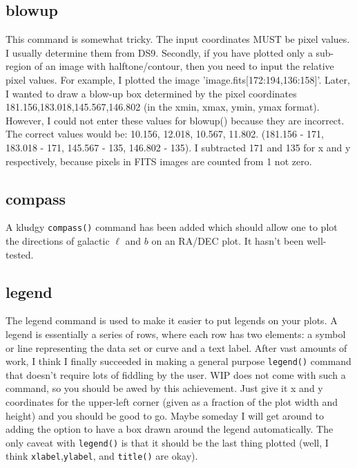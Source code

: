 \documentclass[12pt]{article}
\begin{document}
\subsection{blowup}

This command is somewhat tricky.  The input coordinates MUST be pixel values. I
usually determine them from DS9.  Secondly,  if you have plotted only a
sub-region of an image with halftone/contour, then you need to input the
relative pixel values.  For example, I plotted the image
'image.fits[172:194,136:158]'.  Later, I wanted to draw a blow-up box determined
by the pixel coordinates 181.156,183.018,145.567,146.802 (in the xmin, xmax,
ymin, ymax format).  However, I could not enter these values for blowup()
because they are incorrect.  The correct values would be: 10.156, 12.018,
10.567, 11.802.  (181.156 - 171, 183.018 - 171, 145.567 - 135, 146.802 - 135).
I subtracted 171 and 135 for x and y respectively, because pixels in FITS images
are counted from 1 not zero.

\subsection{compass}

A kludgy \texttt{compass()} command has been added which should allow one to
plot the directions of galactic $\ell$ and $b$ on an RA/DEC plot.  It hasn't
been well-tested.

\subsection{legend}

The legend command is used to make it easier to put legends on your plots. A
legend is essentially a series of rows, where each row has two elements: a
symbol or line representing the data set or curve and a text label. After vast
amounts of work, I think I finally succeeded in making a general purpose
\texttt{legend()} command that doesn't require lots of fiddling by the user. WIP
does not come with such a command, so you should be awed by this achievement.
Just give it x and y coordinates for the upper-left corner (given as a fraction
of the plot width and height) and you should be good to go. Maybe someday I will
get around to adding the option to have a box drawn around the legend
automatically. The only caveat with \texttt{legend()} is that it should be the
last thing plotted (well, I think \texttt{xlabel},\texttt{ylabel}, and
\texttt{title()} are okay).
\end{document}
